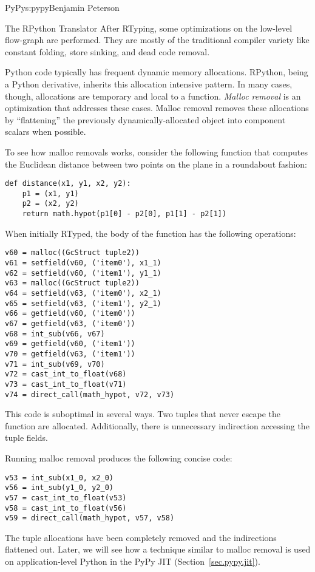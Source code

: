 \begin{aosachapter}{PyPy}{s:pypy}{Benjamin Peterson}
\begin{aosasect1}{The RPython Translator}
After RTyping, some optimizations on the low-level flow-graph are
performed. They are mostly of the traditional compiler variety like constant
folding, store sinking, and dead code removal.

Python code typically has frequent dynamic memory allocations. RPython, being a
Python derivative, inherits this allocation intensive pattern. In many cases,
though, allocations are temporary and local to a function. \emph{Malloc removal}
is an optimization that addresses these cases. Malloc removal removes these
allocations by ``flattening'' the previously dynamically-allocated object into
component scalars when possible.

To see how malloc removals works, consider the following function that computes
the Euclidean distance between two points on the plane in a roundabout fashion:

\begin{verbatim}
def distance(x1, y1, x2, y2):
    p1 = (x1, y1)
    p2 = (x2, y2)
    return math.hypot(p1[0] - p2[0], p1[1] - p2[1])
\end{verbatim}

\noindent When initially RTyped, the body of the function has the following operations:

\begin{verbatim}
v60 = malloc((GcStruct tuple2))
v61 = setfield(v60, ('item0'), x1_1)
v62 = setfield(v60, ('item1'), y1_1)
v63 = malloc((GcStruct tuple2))
v64 = setfield(v63, ('item0'), x2_1)
v65 = setfield(v63, ('item1'), y2_1)
v66 = getfield(v60, ('item0'))
v67 = getfield(v63, ('item0'))
v68 = int_sub(v66, v67)
v69 = getfield(v60, ('item1'))
v70 = getfield(v63, ('item1'))
v71 = int_sub(v69, v70)
v72 = cast_int_to_float(v68)
v73 = cast_int_to_float(v71)
v74 = direct_call(math_hypot, v72, v73)
\end{verbatim}

\noindent This code is suboptimal in several ways. Two tuples that never escape the
function are allocated. Additionally, there is unnecessary indirection accessing
the tuple fields.

Running malloc removal produces the following concise code:

\begin{verbatim}
v53 = int_sub(x1_0, x2_0)
v56 = int_sub(y1_0, y2_0)
v57 = cast_int_to_float(v53)
v58 = cast_int_to_float(v56)
v59 = direct_call(math_hypot, v57, v58)
\end{verbatim}

\noindent The tuple allocations have been completely removed and the indirections
flattened out. Later, we will see how a technique similar to malloc removal is
used on application-level Python in the PyPy JIT (Section~\ref{sec.pypy.jit}).


\end{aosasect1}
\end{aosachapter}
